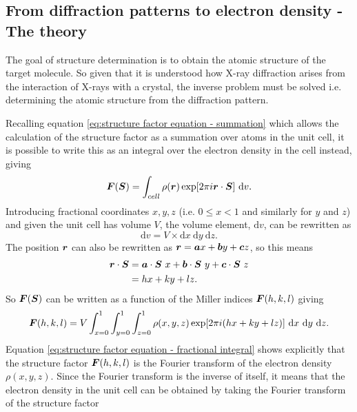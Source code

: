     \subsection{From diffraction patterns to electron density - The theory}
    \label{sub:From diffraction patterns to electron density - The theory}
        The goal of structure determination is to obtain the atomic structure of the target molecule.
        So given that it is understood how X-ray diffraction arises from the interaction of X-rays with a crystal, the inverse problem must be solved i.e. determining the atomic structure from the diffraction pattern.

        Recalling equation \ref{eq:structure factor equation - summation} which allows the calculation of the structure factor as a summation over atoms in the unit cell, it is possible to write this as an integral over the electron density in the cell instead, giving
        \begin{equation}
            \boldsymbol{F}(\boldsymbol{S}) = \int_{cell} \rho(\boldsymbol{r})\exp[2 \pi i \boldsymbol{r} \cdot \boldsymbol{S}]\ \mathrm{d}v.
            \label{eq:structure factor equation - integral}
        \end{equation}
        Introducing fractional coordinates $x, y, z$ (i.e. $0 \leq x < 1$ and similarly for $y$ and $z$) and given the unit cell has volume $V$, the volume element, $\mathrm{d}v$, can be rewritten as
        \begin{equation}
            \mathrm{d}v = V \times \mathrm{d}x\ \mathrm{d}y\ \mathrm{d}z.
        \end{equation}
        The position $\boldsymbol{r}$ can also be rewritten as $\boldsymbol{r} = \boldsymbol{a}x + \boldsymbol{b}y + \boldsymbol{c}z$, so this means
        \begin{align}
            \boldsymbol{r} \cdot \boldsymbol{S} &= \boldsymbol{a}\cdot\boldsymbol{S}\ x + \boldsymbol{b}\cdot\boldsymbol{S}\ y + \boldsymbol{c}\cdot\boldsymbol{S}\ z \\
            &= hx + ky + lz.
        \end{align}
        So $\boldsymbol{F}(\boldsymbol{S})$ can be written as a function of the Miller indices $\boldsymbol{F}(h,k,l)$ giving
        \begin{equation}
            \bs{F}(h,k,l) = V \int_{x=0}^1 \int_{y=0}^1 \int_{z=0}^1 \rho(x,y,z) \exp[2\pi i (hx + ky + lz)]\ \mathrm{d}x\ \mathrm{d}y\ \mathrm{d}z.
            \label{eq:structure factor equation - fractional integral}
        \end{equation}
        Equation \ref{eq:structure factor equation - fractional integral} shows explicitly that the structure factor $\boldsymbol{F}(h,k,l)$ is the Fourier transform of the electron density $\rho(x,y,z)$. Since the Fourier transform is the inverse of itself, it means that the electron density in the unit cell can be obtained by taking the Fourier transform of the structure factor
